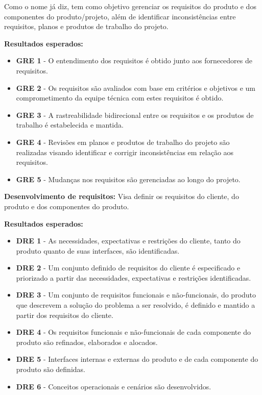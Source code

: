 Como o nome já diz, tem como objetivo gerenciar os requisitos do produto e dos componentes do produto/projeto, além de identificar inconsistências entre requisitos, planos e produtos de trabalho do projeto.

\textbf{Resultados esperados:}
\begin{itemize}
\item \textbf{GRE 1} - O entendimento dos requisitos é obtido junto aos fornecedores de requisitos.
\item \textbf{GRE 2} - Os requisitos são avaliados com base em critérios e objetivos e um comprometimento da equipe técnica com estes requisitos é obtido.
\item \textbf{GRE 3} - A rastreabilidade bidirecional entre os requisitos e os produtos de trabalho é estabelecida e mantida.
\item \textbf{GRE 4} - Revisões em planos e produtos de trabalho do projeto são realizadas visando identificar e corrigir inconsistências em relação aos requisitos.
\item \textbf{GRE 5} - Mudanças nos requisitos são gerenciadas ao longo do projeto.
\end{itemize}

\textbf{Desenvolvimento de requisitos:}
Visa definir os requisitos do cliente, do produto e dos componentes do produto.

\textbf{Resultados esperados:}
\begin{itemize}
\item \textbf{DRE 1} - As necessidades, expectativas e restrições do cliente, tanto do produto quanto de suas interfaces, são identificadas.
\item \textbf{DRE 2} - Um conjunto definido de requisitos do cliente é especificado e priorizado a partir das necessidades, expectativas e restrições identificadas.
\item \textbf{DRE 3} - Um conjunto de requisitos funcionais e não-funcionais, do produto que descrevem a solução do problema a ser resolvido, é definido e mantido a partir dos requisitos do cliente.
\item \textbf{DRE 4} - Os requisitos funcionais e não-funcionais de cada componente do produto são refinados, elaborados e alocados.
\item \textbf{DRE 5} - Interfaces internas e externas do produto e de cada componente do produto são definidas.
\item \textbf{DRE 6} - Conceitos operacionais e cenários são desenvolvidos.
\end{itemize}
